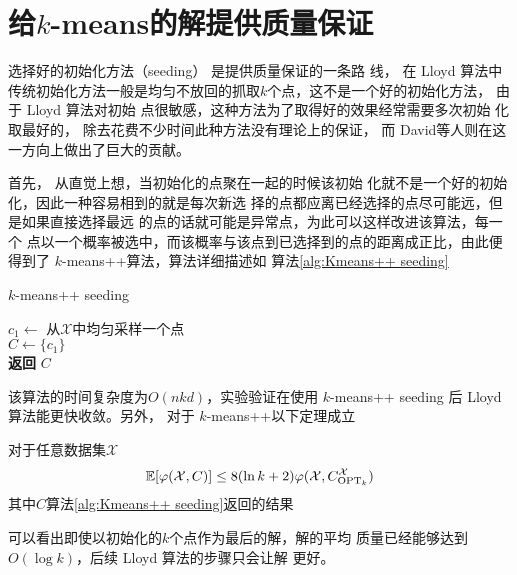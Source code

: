 \section{给\texorpdfstring{$k$}{k}-means的解提供质量保证}

选择好的初始化方法（seeding） 是提供质量保证的一条路
线， 在 Lloyd 算法中传统初始化方法一般是均匀不放回的抓取$k$个点，这不是一个好的初始化方法， 由于 Lloyd 算法对初始
点很敏感，这种方法为了取得好的效果经常需要多次初始
化取最好的， 除去花费不少时间此种方法没有理论上的保证，
而 David等人则在这一方向上做出了巨大的贡献。

首先， 从直觉上想，当初始化的点聚在一起的时候该初始
化就不是一个好的初始化，因此一种容易相到的就是每次新选
择的点都应离已经选择的点尽可能远，但是如果直接选择最远
的点的话就可能是异常点，为此可以这样改进该算法，每一个
点以一个概率被选中，而该概率与该点到已选择到的点的距离成正比，由此便得到了 $k$-means++算法，算法详细描述如
算法\ref{alg:Kmeans++ seeding}

\begin{algorithm}
    \caption{$k$-means++ seeding}\label{alg:Kmeans++ seeding}
    $c_1 \gets $ 从$\mathcal{X}$中均匀采样一个点 \\
    $C \gets \{c_1\}$ \\
    \textbf{返回} $C$
\end{algorithm}
该算法的时间复杂度为$O(nkd)$，实验验证在使用 $k$-means++ seeding 后 Lloyd 算法能更快收敛。另外， 对于 $k$-means++以下定理成立
\begin{theorem}
    对于任意数据集$\mathcal{X}$
    \begin{equation*}
    \mathbb{E}[\varphi(\mathcal{X},C)] \leq 8(\ln k + 2) \varphi(\mathcal{X},C_{\text{OPT}_k}^{\mathcal{X}})
    \end{equation*}
    其中$C$算法\ref{alg:Kmeans++ seeding}返回的结果
\end{theorem}
可以看出即使以初始化的$k$个点作为最后的解，解的平均
质量已经能够达到$O(\log k)$，后续 Lloyd 算法的步骤只会让解
更好。

